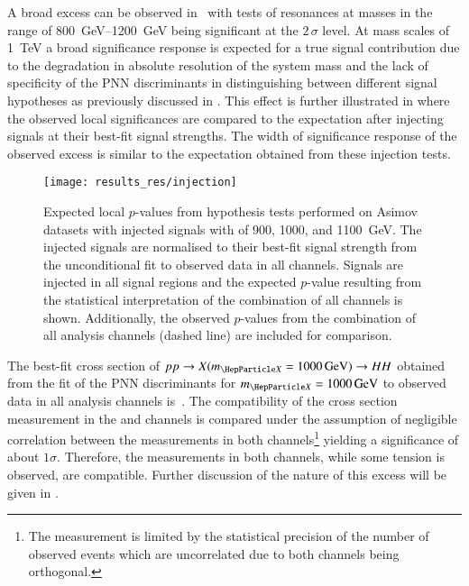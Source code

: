 A broad excess can be observed in~ with tests
of resonances at masses in the range of \SIrange{800}{1200}{\GeV}
being significant at the $2\,\sigma$ level. At mass scales of
\SI{1}{\TeV} a broad significance response is expected for a true
signal contribution due to the degradation in absolute resolution of
the \HH system mass and the lack of specificity of the PNN
discriminants in distinguishing between different signal hypotheses as
previously discussed in . This effect is further
illustrated in  where the observed
local significances are compared to the expectation after injecting
signals at their best-fit signal strengths. The width of significance
response of the observed excess is similar to the expectation obtained
from these injection tests.

\begin{figure}[htbp]
  \centering

  \texttt{[image: results\_res/injection]}

  \caption{Expected local $p$-values from hypothesis tests performed
    on Asimov datasets with injected signals with \mX of 900, 1000,
    and \SI[group-minimum-digits=5]{1100}{\GeV}. The injected signals
    are normalised to their best-fit signal strength from the
    unconditional fit to observed data in all channels.  Signals are
    injected in all signal regions and the expected $p$-value
    resulting from the statistical interpretation of the combination
    of all channels is shown. Additionally, the observed $p$-values
    from the combination of all analysis channels (dashed line) are
    included for comparison.}
  \label{fig:local_pvalues_injected}
\end{figure}

The best-fit cross section of $pp \to X(\mX = \SI{1000}{\GeV}) \to HH$
obtained from the fit of the PNN discriminants for
$\mX = \SI{1000}{\GeV}$ to observed data in all analysis channels
is~. The compatibility of the
cross section measurement in the \hadhad and \lephad channels is
compared under the assumption of negligible correlation between the
measurements in both channels\footnote{The measurement is limited by
  the statistical precision of the number of observed events which are
  uncorrelated due to both channels being orthogonal.} yielding a
significance of about $1\sigma$. Therefore, the measurements in both
channels, while some tension is observed, are compatible. Further
discussion of the nature of this excess will be given in
.

